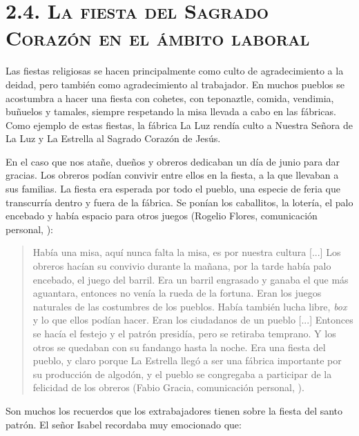 \documentclass[14pt,letterpaper,twoside]{extbook} %
\begin{document}
\section*{\mdseries\large\textsc{2.4. La fiesta del Sagrado Corazón en el ámbito laboral}}

\noindent Las fiestas religiosas se hacen principalmente como culto de agradecimiento a la deidad, pero también como agradecimiento al trabajador. En muchos pueblos se acostumbra a hacer una fiesta con cohetes, con teponaztle, comida, vendimia, buñuelos y tamales, siempre respetando la misa llevada a cabo en las fábricas. Como ejemplo de estas fiestas, la fábrica La Luz rendía culto a Nuestra Señora de La Luz y La Estrella al Sagrado Corazón de Jesús.

En el caso que nos atañe, dueños y obreros dedicaban un día de junio para dar gracias. Los obreros podían convivir entre ellos en la fiesta, a la que llevaban a sus familias. La fiesta era esperada por todo el pueblo, una especie de feria que transcurría dentro y fuera de la fábrica.
Se ponían los caballitos, la lotería, el palo encebado y había espacio para otros juegos (Rogelio Flores, comunicación personal, ):

\begin{quotation}
\noindent Había una misa, aquí nunca falta la misa, es por nuestra cultura [...] Los obreros hacían su convivio durante la mañana, por la tarde había palo encebado, el juego del barril. Era un barril engrasado y ganaba el que más aguantara, entonces no venía la rueda de la fortuna. Eran los juegos naturales de las costumbres de los pueblos. Había también lucha libre, \textit{box} y lo que ellos podían hacer. Eran los ciudadanos de un pueblo [...] Entonces se hacía el festejo y el patrón presidía, pero se retiraba temprano. Y los otros se quedaban con su fandango hasta la noche. Era una fiesta del pueblo, y claro porque La Estrella llegó a ser una fábrica importante por su producción de algodón, y el pueblo se congregaba a participar de la felicidad de los obreros (Fabio Gracia, comunicación personal, ).
\end{quotation}

\noindent Son muchos los recuerdos que los extrabajadores tienen sobre la fiesta del santo patrón. El señor Isabel recordaba muy emocionado que:
\end{document}
